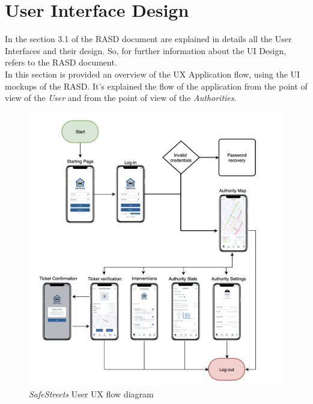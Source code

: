 \documentclass{article}
\begin{document}
\section{User Interface Design}
In the section 3.1 of the RASD document are explained in details all the User Interfaces and their design. So, for further information about the UI Design, refers to the RASD document. \\
In this section is provided an overview of the UX Application flow, using the UI mockups of the RASD. It's explained the flow of the application from the point of view of the {\it User} and from the point of view of the {\it Authorities}.
	\begin{figure}[H]
			\centering
			\includegraphics[scale=0.5]{Images/UX/user_ux_flow.png}
			\caption{{\it SafeStreets} User UX flow diagram}
	\end{figure}
\end{document}
